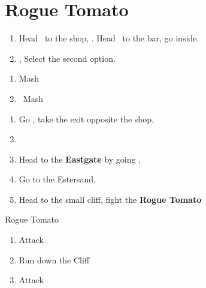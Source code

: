 \chapter{Rogue Tomato}
\begin{enumerate}
	\item Head \south\ to the shop, \cs. Head \north\ to the bar, go inside.
	\item \cs, Select the second option.
\end{enumerate}
\begin{liscense}
	\begin{enumerate}
		\item Mash
		\item \squarec\ Mash
	\end{enumerate}
\end{liscense}
\begin{enumerate}
	\item Go \south, take the exit opposite the shop.
	\item {}
	\item Head to the \textbf{Eastgate} by going \east, \cs
	\item Go to the Estersand, \cs
	\item Head to the small cliff, fight the \textbf{Rogue Tomato}
\end{enumerate}
\begin{battle}{Rogue Tomato}
	\begin{enumerate}
		\item Attack
		\item Run down the Cliff
		\item Attack
	\end{enumerate}
\end{battle}